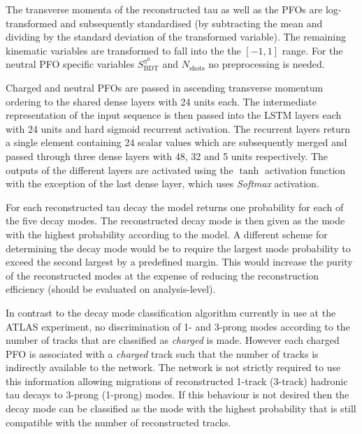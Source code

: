  The transverse momenta of the reconstructed tau as
well as the PFOs are log-transformed and subsequently standardised (by
subtracting the mean and dividing by the standard deviation of the transformed
variable). The remaining kinematic variables are transformed to fall into the
the $[-1, 1]$ range. For the neutral PFO specific variables
$S_\text{BDT}^{\pi^0}$ and $N_\text{shots}$ no preprocessing is needed.

Charged and neutral PFOs are passed in ascending transverse momentum ordering to
the shared dense layers with 24 units each. The intermediate representation of
the input sequence is then passed into the LSTM layers each with 24 units and
hard sigmoid recurrent activation. The recurrent layers return a single element
containing 24 scalar values which are subsequently merged and passed through
three dense layers with 48, 32 and 5 units respectively. The outputs of the
different layers are activated using the $\tanh$ activation function with the
exception of the last dense layer, which uses \emph{Softmax} activation.

For each reconstructed tau decay the model returns one probability for each of
the five decay modes. The reconstructed decay mode is then given as the mode
with the highest probability according to the model. A different scheme for
determining the decay mode would be to require the largest mode probability to
exceed the second largest by a predefined margin. This would increase the purity
of the reconstructed modes at the expense of reducing the reconstruction
efficiency (should be evaluated on analysis-level).

In contrast to the decay mode classification algorithm currently in use at the
ATLAS experiment, no discrimination of 1- and 3-prong modes according to the
number of tracks that are classified as \emph{charged} is made. However each
charged PFO is associated with a \emph{charged} track such that the number of
tracks is indirectly available to the network. The network is not strictly
required to use this information allowing migrations of reconstructed 1-track
(3-track) hadronic tau decays to 3-prong (1-prong) modes. If this behaviour is
not desired then the decay mode can be classified as the mode with the highest
probability that is still compatible with the number of reconstructed tracks.

